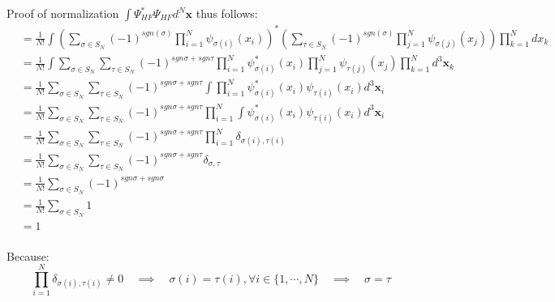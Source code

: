 \documentclass[a4paper, 12pt]{report}
\begin{document}
Proof of normalization $\displaystyle\int\Psi^*_{HF}\Psi_{HF} d^N\mathbf x$ thus follows:
\begin{equation}
\begin{array}{ll}
&= \displaystyle\frac{1}{N!}\int\left(\sum_{\sigma\in S_N}(-1)^{sgn(\sigma)}\prod_{i=1}^N\psi_{\sigma(i)}(x_i)\right)^*\left(\sum_{\tau\in S_N}(-1)^{sgn(\sigma)}\prod_{j=1}^N\psi_{\sigma(j)}(x_j)\right)\prod_{k=1}^N dx_k \\
&=\displaystyle\frac{1}{N!}\int\sum_{\sigma\in S_N}\sum_{\tau\in S_N}(-1)^{sgn\sigma+sgn\tau}\prod_{i=1}^N\psi^*_{\sigma(i)}(x_i)\prod_{j=1}^N\psi_{\tau(j)}(x_j)\prod_{k=1}^N d^3\mathbf x_k \\
&=\displaystyle\frac{1}{N!}\sum_{\sigma\in S_N}\sum_{\tau\in S_N}(-1)^{sgn\sigma+sgn\tau}\int\prod_{i=1}^N\psi^*_{\sigma(i)}(x_i)\psi_{\tau(i)}(x_i) d^3\mathbf x_i \\
&=\displaystyle\frac{1}{N!}\sum_{\sigma\in S_N}\sum_{\tau\in S_N}(-1)^{sgn\sigma+sgn\tau}\prod_{i=1}^N\int\psi^*_{\sigma(i)}(x_i)\psi_{\tau(i)}(x_i) d^3\mathbf x_i \\
&=\displaystyle\frac{1}{N!}\sum_{\sigma\in S_N}\sum_{\tau\in S_N}(-1)^{sgn\sigma+sgn\tau}\prod_{i=1}^N\delta_{\sigma(i),\tau(i)} \\
&=\displaystyle\frac{1}{N!}\sum_{\sigma\in S_N}\sum_{\tau\in S_N}(-1)^{sgn\sigma+sgn\tau}\delta_{\sigma,\tau} \\
&=\displaystyle\frac{1}{N!}\sum_{\sigma\in S_N}(-1)^{sgn\sigma+sgn\sigma} \\
&=\displaystyle\frac{1}{N!}\sum_{\sigma\in S_N}1 \\
&=1 \\
\end{array}
\end{equation}

Because:
\begin{equation}
\prod_{i=1}^N\delta_{\sigma(i),\tau(i)}\neq 0\quad\implies\quad
\sigma(i)=\tau(i),\forall i\in\{1,\cdots,N\}\quad\implies\quad
\sigma = \tau
\end{equation}
\end{document}
